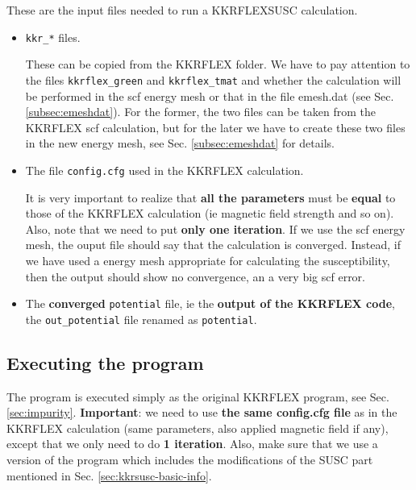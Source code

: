 \documentclass[a4paper,10pt,fullpage]{report}
\begin{document}
These are the input files needed to run a KKRFLEXSUSC calculation.

\begin{itemize}

\item \verb|kkr_*| files.

These can be copied from the KKRFLEX folder. 
We have to pay attention to the files 
\verb|kkrflex_green| and \verb|kkrflex_tmat| 
and whether the calculation
will be performed in the scf energy mesh or that in
the file emesh.dat (see Sec. \ref{subsec:emeshdat}).
For the former, the two files can be taken from the
KKRFLEX scf calculation, but for the later we have to
create these two files in the new energy mesh, see
Sec.  \ref{subsec:emeshdat} for details.

\item The file  \verb|config.cfg| used in the KKRFLEX calculation.

It is very important to realize that \textbf{all the parameters} 
must be \textbf{equal} to those of the KKRFLEX calculation
(ie magnetic field strength and so on). Also,
note that we need to put \textbf{only one iteration}.
If we use the scf energy mesh, the ouput file should say 
that the calculation is converged. Instead, if we have used 
a energy mesh appropriate for calculating the susceptibility, then
the output should show no convergence, an a very big scf error.



\item The \textbf{converged} \verb|potential| file, ie the 
\textbf{output of the KKRFLEX code}, the \verb|out_potential| file
renamed as \verb|potential|.



\end{itemize}

\subsection{Executing the program}

The program is executed simply as the original KKRFLEX program, 
see Sec. \ref{sec:impurity}.
\textbf{Important}: we need to use \textbf{the same config.cfg file} as 
in the KKRFLEX calculation
(same parameters, also applied magnetic field if any), 
except that we only need to do \textbf{1 iteration}. 
Also, make sure that we use a version of the program which includes the
modifications of the SUSC part mentioned in Sec. \ref{sec:kkrsusc-basic-info}.
\end{document}
